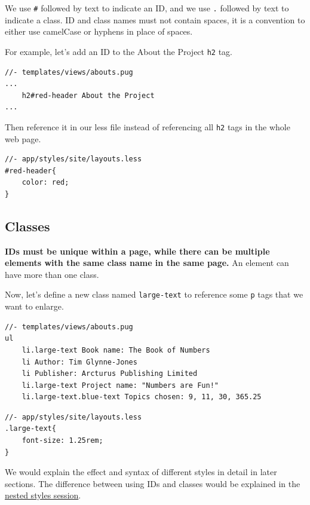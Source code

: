 We use \texttt{\#} followed by text to indicate an ID, and we use \texttt{.} followed by text to indicate a class. ID and class names must not contain spaces, it is a convention to either use camelCase or hyphens in place of spaces.
\vspace{6mm}

For example, let's add an ID to the About the Project \texttt{h2} tag.

\begin{lstlisting}[language=pug]
//- templates/views/abouts.pug
...
    h2#red-header About the Project
... 
\end{lstlisting}

Then reference it in our less file instead of referencing all \texttt{h2} tags in the whole web page.

\begin{lstlisting}[language=pug]
//- app/styles/site/layouts.less
#red-header{
    color: red;
}
\end{lstlisting}

\subsection{Classes}

\textbf{IDs must be unique within a page, while there can be multiple elements with the same class name in the same page.} An element can have more than one class.
\vspace{6mm}

Now, let's define a new class named \texttt{large-text} to reference some \texttt{p} tags that we want to enlarge.

\begin{lstlisting}[language=pug]
//- templates/views/abouts.pug
ul
    li.large-text Book name: The Book of Numbers
    li Author: Tim Glynne-Jones
    li Publisher: Arcturus Publishing Limited
    li.large-text Project name: "Numbers are Fun!"
    li.large-text.blue-text Topics chosen: 9, 11, 30, 365.25
\end{lstlisting}

\begin{lstlisting}[language=pug]
//- app/styles/site/layouts.less
.large-text{
    font-size: 1.25rem;
}
\end{lstlisting}

We would explain the effect and syntax of different styles in detail in later sections. The difference between using IDs and classes would be explained in the \hyperref[sec:nestedstyles]{nested styles session}.

